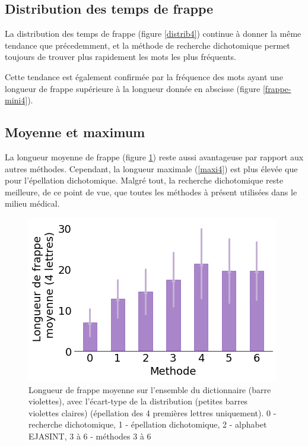 \documentclass[twoside,twocolumn]{article}
\begin{document}
\subsection{Distribution des temps de frappe}

La distribution des temps de frappe (figure \ref{distrib4}) continue à donner la même tendance que précedemment, et la méthode de recherche dichotomique permet toujours de trouver plus rapidement les mots les plus fréquents.

Cette tendance est également confirmée par la fréquence des mots ayant une longueur de frappe supérieure à la longueur donnée en abscisse (figure \ref{frappe-mini4}).





\subsection{Moyenne et maximum}

La longueur moyenne de frappe (figure \ref{mean4}) reste aussi avantageuse par rapport aux autres méthodes. Cependant, la longueur maximale (\ref{maxi4}) est plus élevée que pour l'épellation dichotomique. Malgré tout, la recherche dichotomique reste meilleure, de ce point de vue, que toutes les méthodes à présent utilisées dans le milieu médical.

\begin{center}
\begin{figure}
  \includegraphics[scale=0.5]{mean4.png}
  \caption{Longueur de frappe moyenne sur l'ensemble du dictionnaire (barre violettes), avec l'écart-type de la distribution (petites barres violettes claires) (épellation des 4 premières lettres uniquement). 0 - recherche dichotomique, 1 - épellation dichotomique, 2 - alphabet EJASINT, 3 à 6 - méthodes 3 à 6}
  \label{mean4}
\end{figure}
\end{center}
\end{document}
